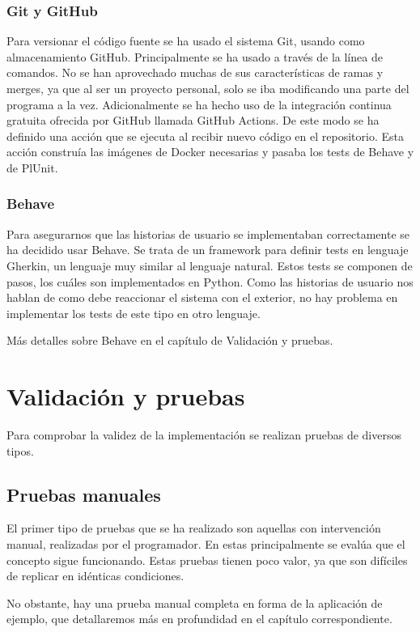 \documentclass[12pt]{report} %
\begin{document}
\subsection{Git y GitHub}
Para versionar el código fuente se ha usado el sistema Git, usando como almacenamiento GitHub. Principalmente se ha usado a través de la línea de comandos.
No se han aprovechado muchas de sus características de ramas y merges, ya que al ser un proyecto personal, solo se iba modificando una parte del programa a la vez.
Adicionalmente se ha hecho uso de la integración continua gratuita ofrecida por GitHub llamada GitHub Actions. De este modo se ha definido una acción que se ejecuta al recibir nuevo código en el repositorio.
Esta acción construía las imágenes de Docker necesarias y pasaba los tests de Behave y de PlUnit.

\subsection{Behave}
Para asegurarnos que las historias de usuario se implementaban correctamente se ha decidido usar Behave.
Se trata de un framework para definir tests en lenguaje Gherkin, un lenguaje muy similar al lenguaje natural. Estos tests se componen de pasos,
los cuáles son implementados en Python. Como las historias de usuario nos hablan de como debe reaccionar el sistema con el exterior, no hay problema en implementar los tests de este tipo en otro lenguaje.

Más detalles sobre Behave en el capítulo de Validación y pruebas.


\chapter{Validación y pruebas}

Para comprobar la validez de la implementación se realizan pruebas de diversos tipos.

\section{Pruebas manuales}

El primer tipo de pruebas que se ha realizado son aquellas con intervención manual, realizadas por el programador. En estas principalmente se evalúa que el concepto sigue funcionando. Estas pruebas tienen poco valor, ya que son difíciles de replicar en idénticas condiciones.

No obstante, hay una prueba manual completa en forma de la aplicación de ejemplo, que detallaremos más en profundidad en el capítulo correspondiente.
\end{document}
